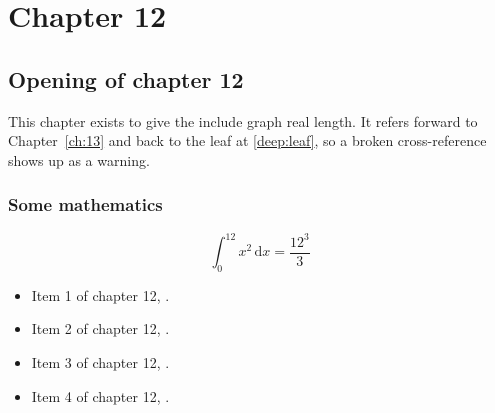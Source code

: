\chapter{Chapter 12}
\label{ch:12}
\section{Opening of chapter 12}
This chapter exists to give the include graph real length. It refers
forward to Chapter~\ref{ch:13} and back to the leaf
at \ref{deep:leaf}, so a broken cross-reference shows up as a warning.

\subsection{Some mathematics}
\begin{equation}
  \int_0^{12} x^{2} \, \mathrm{d}x = \frac{12^{3}}{3}
\end{equation}

\begin{itemize}
  \item Item 1 of chapter 12, .
  \item Item 2 of chapter 12, .
  \item Item 3 of chapter 12, .
  \item Item 4 of chapter 12, .
\end{itemize}
